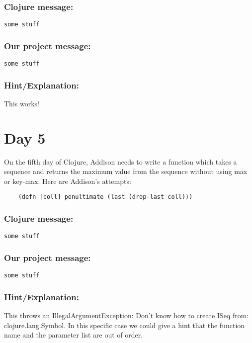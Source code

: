 \documentclass[12pt]{article}
\begin{document}
{\addtolength{\leftskip}{10mm}

	\subsubsection*{Clojure message:}
	
	\verb|some stuff|

	\subsubsection*{Our project message:}
	
	\verb|some stuff|
	
	\subsubsection*{Hint/Explanation:}
	
This works!

}

\section{Day 5}
On the fifth day of Clojure, Addison needs to write a function which takes a sequence and returns the maximum value from the sequence without using max or key-max. Here are Addison's attempts:

\begin{verbatim}
	(defn [coll] penultimate (last (drop-last coll)))
\end{verbatim}

{\addtolength{\leftskip}{10mm}

	\subsubsection*{Clojure message:}
	
	\verb|some stuff|

	\subsubsection*{Our project message:}
	
	\verb|some stuff|
	
	\subsubsection*{Hint/Explanation:}
	
This throws an IllegalArgumentException: Don't know how to create ISeq from: clojure.lang.Symbol. In this specific case we could give a hint that the function name and the parameter list are out of order.

}
\end{document}
